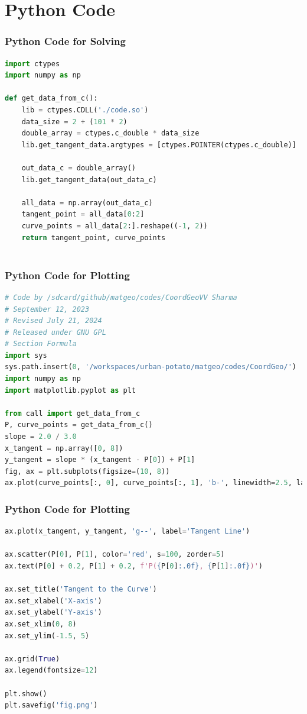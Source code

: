 \documentclass{beamer}
\theoremstyle{remark}
\numberwithin{equation}{section}
\begin{document}
\section{Python Code}
\begin{frame}[fragile]
\frametitle{Python Code for Solving}
\begin{lstlisting}[language=Python]
import ctypes
import numpy as np

def get_data_from_c():
    lib = ctypes.CDLL('./code.so')
    data_size = 2 + (101 * 2)
    double_array = ctypes.c_double * data_size
    lib.get_tangent_data.argtypes = [ctypes.POINTER(ctypes.c_double)]

    out_data_c = double_array()
    lib.get_tangent_data(out_data_c)

    all_data = np.array(out_data_c)
    tangent_point = all_data[0:2]
    curve_points = all_data[2:].reshape((-1, 2))
    return tangent_point, curve_points



\end{lstlisting}
\end{frame}
 
\begin{frame}[fragile]
\frametitle{Python Code for Plotting}
\begin{lstlisting}[language=Python]
# Code by /sdcard/github/matgeo/codes/CoordGeoVV Sharma
# September 12, 2023
# Revised July 21, 2024
# Released under GNU GPL
# Section Formula
import sys
sys.path.insert(0, '/workspaces/urban-potato/matgeo/codes/CoordGeo/') 
import numpy as np
import matplotlib.pyplot as plt

from call import get_data_from_c
P, curve_points = get_data_from_c()
slope = 2.0 / 3.0
x_tangent = np.array([0, 8])
y_tangent = slope * (x_tangent - P[0]) + P[1]
fig, ax = plt.subplots(figsize=(10, 8))
ax.plot(curve_points[:, 0], curve_points[:, 1], 'b-', linewidth=2.5, label='Curve: $y = \\sqrt{4x-3} - 1$')

\end{lstlisting}
\end{frame}
\begin{frame}[fragile]
\frametitle{Python Code for Plotting}
\begin{lstlisting}[language=Python]
ax.plot(x_tangent, y_tangent, 'g--', label='Tangent Line')

ax.scatter(P[0], P[1], color='red', s=100, zorder=5)
ax.text(P[0] + 0.2, P[1] + 0.2, f'P({P[0]:.0f}, {P[1]:.0f})')

ax.set_title('Tangent to the Curve')
ax.set_xlabel('X-axis')
ax.set_ylabel('Y-axis')
ax.set_xlim(0, 8)
ax.set_ylim(-1.5, 5)

ax.grid(True)
ax.legend(fontsize=12)

plt.show()
plt.savefig('fig.png')
           
\end{lstlisting}
\end{frame}
 
\end{document}
